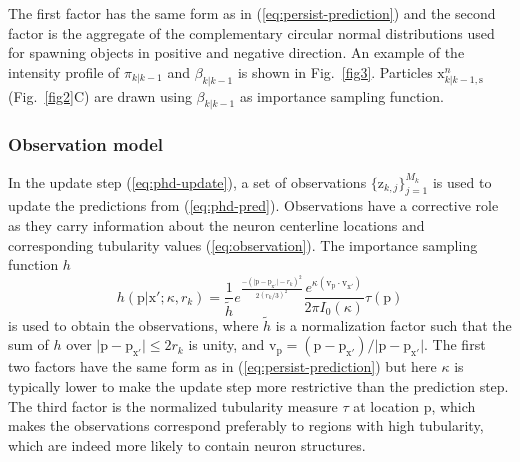 The first factor has the same form as in (\ref{eq:persist-prediction}) and the second factor is the aggregate of the complementary circular normal distributions used for spawning objects in positive and negative direction. An example of the intensity profile of $\pi_{k|k-1}$ and $\beta_{k|k-1}$ is shown in Fig.~\ref{fig3}. Particles $\mathrm{x}_{k|k-1,\mathrm{s}}^{n}$ (Fig.~\ref{fig2}C) are drawn using $\beta_{k|k-1}$ as importance sampling function.

\subsubsection{Observation model}
\label{sssec:observation-model}
In the update step (\ref{eq:phd-update}), a set of observations $\{\mathrm{z}_{k,j}\}_{j=1}^{M_k}$ is used to update the predictions from (\ref{eq:phd-pred}). Observations have a corrective role as they carry information about the neuron centerline locations and corresponding tubularity values (\ref{eq:observation}). The importance sampling function $h$
\begin{equation}
\label{eq:observation-importance-sampling}
h(\mathrm{p} | \mathrm{x'}; \kappa, r_k) = \frac{1}{\tilde{h}} e^{\frac{ -(\vert \mathrm{p} - \mathrm{p}_{\mathrm{x'}}  \vert - r_k)^2  }{2 (r_k/3)^2}} \frac{e^{\kappa (\mathrm{v}_{\mathrm{p}} \cdot \mathrm{v}_{\mathrm{x'}})}}{2 \pi I_0(\kappa)} \tau(\mathrm{p})
\end{equation}%
is used to obtain the observations, where $\tilde{h}$ is a normalization factor such that the sum of $h$ over $\vert \mathrm{p} - \mathrm{p}_{\mathrm{x'}} \vert \leq 2r_k$ is unity, and $\mathrm{v}_{\mathrm{p}}=(\mathrm{p}-\mathrm{p}_{\mathrm{x'}})/\vert \mathrm{p}-\mathrm{p}_{\mathrm{x'}}\vert$. The first two factors have the same form as in (\ref{eq:persist-prediction}) but here $\kappa$ is typically lower to make the update step more restrictive than the prediction step. The third factor is the normalized tubularity measure $\tau$ \cite{sato1998three} at location $\mathrm{p}$, which makes the observations correspond preferably to regions with high tubularity, which are indeed more likely to contain neuron structures.

